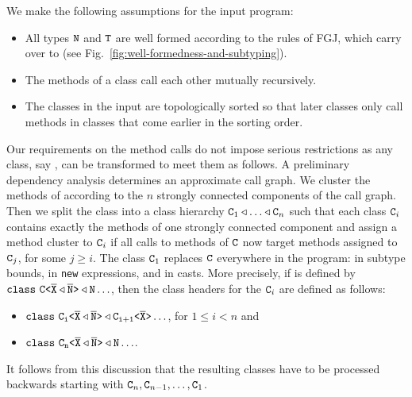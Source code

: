 We make the following assumptions for the input program:
\begin{itemize}
\item All types ${\tt N}$ and ${\tt T}$ are well formed according to the
  rules of FGJ, which carry over to \TFGJ (see Fig.~\ref{fig:well-formedness-and-subtyping}).
\item The methods of a class call each other mutually recursively.
\item The classes in the input are topologically sorted so that later
  classes only call methods in classes that come earlier in the
  sorting order.
\end{itemize}
Our requirements on the method calls do not impose serious
restrictions as any class, say , can be transformed to meet them as
follows. A preliminary dependency analysis determines an 
approximate call graph. We cluster the methods of  according to
the $n$ strongly
connected components of the call graph. Then we split the class into a
class hierarchy 
$\mv{C}_1 \extends \dots \extends \mv{C}_n$ such that each class ${\tt C}_i$ contains
exactly the methods of one strongly connected component and assign a
method cluster to ${\tt C}_i$ if all calls to methods of  ${\tt C}$ now
target methods assigned to ${\tt C}_j$, for some $j\ge i$. The class
${\tt C}_1$ replaces ${\tt C}$ everywhere in the program: in subtype
bounds, in \texttt{new} expressions, and in casts. More precisely, if
 is defined by $\mathtt{class\ \exptype{C}{\ol X \extends \ol N}
\extends N \dots} $, then the class headers for the ${\tt C}_i$ are
defined as follows:
\begin{itemize}
\item  $\mathtt{class\ \mathtt{C_i \texttt{<} \overline{\tt X} \triangleleft \overline{\tt N} \texttt{>} }
\triangleleft \mathtt{C_{i+1} \texttt{<} \overline{\tt X} \texttt{>} } \dots} $, for $1\le i < n$ and
\item  $\mathtt{class\ \mathtt{C_n \texttt{<} \overline{\tt X} \triangleleft \overline{\tt N} \texttt{>} }
\triangleleft N \dots} $.
\end{itemize}
It follows from this discussion that the resulting classes have to be
processed backwards starting with ${\tt C}_n, {\tt C}_{n-1}, \dots, {\tt C}_1$.

